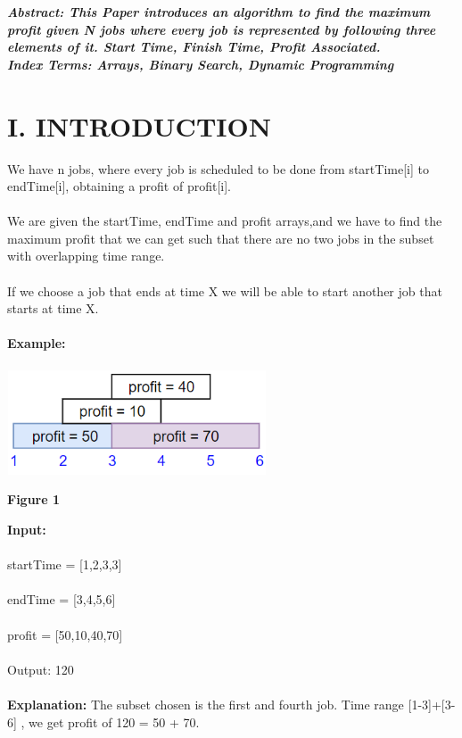 \documentclass[10pt]{article}
\begin{document}
\begin{multicols*}{2}

    \textbf{\emph{{Abstract}: This Paper introduces an algorithm to find the maximum profit given N jobs where every job is represented by following three elements of it. Start Time, Finish Time, Profit Associated.}}\\
	
	\textbf{\emph{{Index Terms}: Arrays, Binary Search, Dynamic Programming\\}}


\section*{I. INTRODUCTION}
 
We have n jobs, where every job is scheduled to be done from startTime[i] to endTime[i], obtaining a profit of profit[i].\\\\We are given the startTime, endTime and profit arrays,and we have to find the maximum profit that we can get such that there are no two jobs in the subset with overlapping time range.\\\\If we choose a job that ends at time X we will be able to start another job that starts at time X.\\\\\textbf{Example:}\\\\

\includegraphics[width=7.7cm, height=3.1cm]{sample1.png}\begin{center}\textbf{Figure 1}\end{center}
\textbf{Input:}\\\\ startTime = [1,2,3,3]\\\\endTime = [3,4,5,6]\\\\profit = [50,10,40,70]\\\\Output: 120\\\\\textbf{Explanation:} The subset chosen is the first and fourth job. 
Time range [1-3]+[3-6] , we get profit of 120 = 50 + 70.


\end{multicols*}
\end{document}
